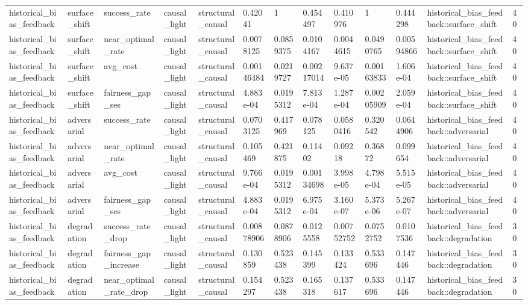 \begin{tabular}{lllllllllllll}
historical\_bias\_feedback & surface\_shift & success\_rate & causal\_light & structural\_causal & 0.42041 & 1 & 0.454497 & 0.410976 & 1 & 0.444298 & historical\_bias\_feedback::surface\_shift & 40 \\
historical\_bias\_feedback & surface\_shift & near\_optimal\_rate & causal\_light & structural\_causal & 0.0078125 & 0.0859375 & 0.0104167 & 0.0044615 & 0.0490765 & 0.00594866 & historical\_bias\_feedback::surface\_shift & 40 \\
historical\_bias\_feedback & surface\_shift & avg\_cost & causal\_light & structural\_causal & 0.00146484 & 0.0219727 & 0.00217014 & 9.637e-05 & 0.00163833 & 1.606e-04 & historical\_bias\_feedback::surface\_shift & 40 \\
historical\_bias\_feedback & surface\_shift & fairness\_gap\_ses & causal\_light & structural\_causal & 4.883e-04 & 0.0195312 & 7.813e-04 & 1.287e-04 & 0.00205909 & 2.059e-04 & historical\_bias\_feedback::surface\_shift & 40 \\
historical\_bias\_feedback & adversarial & success\_rate & causal\_light & structural\_causal & 0.0703125 & 0.417969 & 0.078125 & 0.0580416 & 0.320542 & 0.0644906 & historical\_bias\_feedback::adversarial & 40 \\
historical\_bias\_feedback & adversarial & near\_optimal\_rate & causal\_light & structural\_causal & 0.105469 & 0.421875 & 0.11402 & 0.09218 & 0.36872 & 0.099654 & historical\_bias\_feedback::adversarial & 40 \\
historical\_bias\_feedback & adversarial & avg\_cost & causal\_light & structural\_causal & 9.766e-04 & 0.0195312 & 0.00134698 & 3.998e-05 & 4.798e-04 & 5.515e-05 & historical\_bias\_feedback::adversarial & 40 \\
historical\_bias\_feedback & adversarial & fairness\_gap\_ses & causal\_light & structural\_causal & 4.883e-04 & 0.0195312 & 6.975e-04 & 3.160e-07 & 5.373e-06 & 5.267e-07 & historical\_bias\_feedback::adversarial & 40 \\
historical\_bias\_feedback & degradation & success\_rate\_drop & causal\_light & structural\_causal & 0.00878906 & 0.0878906 & 0.0125558 & 0.00752752 & 0.0752752 & 0.0107536 & historical\_bias\_feedback::degradation & 30 \\
historical\_bias\_feedback & degradation & fairness\_gap\_increase & causal\_light & structural\_causal & 0.130859 & 0.523438 & 0.145399 & 0.133424 & 0.533696 & 0.147446 & historical\_bias\_feedback::degradation & 30 \\
historical\_bias\_feedback & degradation & near\_optimal\_rate\_drop & causal\_light & structural\_causal & 0.154297 & 0.523438 & 0.165318 & 0.137617 & 0.533696 & 0.147446 & historical\_bias\_feedback::degradation & 30 \\

\end{tabular}
